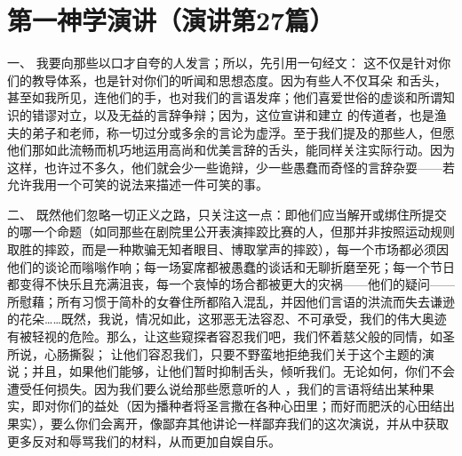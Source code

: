 

\section{第一神学演讲（演讲第27篇）}

\par

\par

一、 我要向那些以口才自夸的人发言；所以，先引用一句经文：  这不仅是针对你们的教导体系，也是针对你们的听闻和思想态度。因为有些人不仅耳朵  和舌头，甚至如我所见，连他们的手，也对我们的言语发痒；他们喜爱世俗的虚谈和所谓知识的错谬对立，以及无益的言辞争辩；因为，这位宣讲和建立  的传道者，也是渔夫的弟子和老师，称一切过分或多余的言论为虚浮。至于我们提及的那些人，但愿他们那如此流畅而机巧地运用高尚和优美言辞的舌头，能同样关注实际行动。因为这样，也许过不多久，他们就会少一些诡辩，少一些愚蠢而奇怪的言辞杂耍——若允许我用一个可笑的说法来描述一件可笑的事。\par

二、 既然他们忽略一切正义之路，只关注这一点：即他们应当解开或绑住所提交的哪一个命题（如同那些在剧院里公开表演摔跤比赛的人，但那并非按照运动规则取胜的摔跤，而是一种欺骗无知者眼目、博取掌声的摔跤），每一个市场都必须因他们的谈论而嗡嗡作响；每一场宴席都被愚蠢的谈话和无聊折磨至死；每一个节日都变得不快乐且充满沮丧，每一个哀悼的场合都被更大的灾祸——他们的疑问——所慰藉；所有习惯于简朴的女眷住所都陷入混乱，并因他们言语的洪流而失去谦逊的花朵……既然，我说，情况如此，这邪恶无法容忍、不可承受，我们的伟大奥迹有被轻视的危险。那么，让这些窥探者容忍我们吧，我们怀着慈父般的同情，如圣所说，心肠撕裂；  让他们容忍我们，只要不野蛮地拒绝我们关于这个主题的演说；并且，如果他们能够，让他们暂时抑制舌头，倾听我们。无论如何，你们不会遭受任何损失。因为我们要么说给那些愿意听的人 ，我们的言语将结出某种果实，即对你们的益处（因为播种者将圣言撒在各种心田里；而好而肥沃的心田结出果实），要么你们会离开，像鄙弃其他讲论一样鄙弃我们的这次演说，并从中获取更多反对和辱骂我们的材料，从而更加自娱自乐。\par

